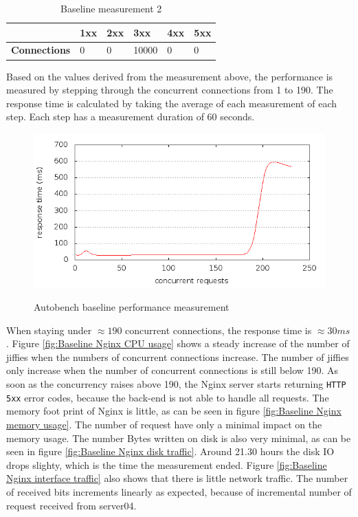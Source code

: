 \documentclass[Measurements]{subfiles}
\begin{document}
\begin{table}[h]
\caption{Baseline measurement 2}
\begin{tabular}{|p{2cm}|p{}|p{}|p{}|p{}|p{}|}
\hline
 & \textbf{1xx} & \textbf{2xx} & \textbf{3xx} & \textbf{4xx} & \textbf{5xx} \\ \hline
\textbf{Connections} & 0 & 0 & 10000 & 0 & 0 \\ \hline
\end{tabular}
\label{fig:Baseline measurement 2}
\end{table}

Based on the values derived from the measurement above, the performance is measured by stepping through the concurrent connections from 1 to 190. The response time is calculated by taking the average of each measurement of  each step. Each step has a measurement duration of 60 seconds. 

\begin{figure}[H]
\caption{Autobench baseline performance measurement}
\centering
\includegraphics[scale=0.55] {images/results/baseline_wp/output.png}
\label{fig:Baseline performance measurement}
\end{figure}

When staying under $\approx 190$ concurrent connections, the response time is \mbox{$\approx 30 ms$}. Figure \ref{fig:Baseline Nginx CPU usage} shows a steady increase of the number of jiffies when the numbers of concurrent connections increase. The number of jiffies only increase when the number of concurrent connections is still below 190. As soon as the concurrency raises above 190, the Nginx server starts returning \verb+HTTP 5xx+ error codes, because the back-end is not able to handle all requests. The memory foot print of Nginx is little, as can be seen in figure \ref{fig:Baseline Nginx memory usage}. The number of request have only a minimal impact on the memory usage. The number Bytes written on disk is also very minimal, as can be seen in figure \ref{fig:Baseline Nginx disk traffic}. Around 21.30 hours the disk IO drops slighty, which is the time the measurement ended. Figure \ref{fig:Baseline Nginx interface traffic} also shows that there is little network traffic. The number of received bits increments linearly as expected, because of incremental number of request received from server04.
\end{document}

